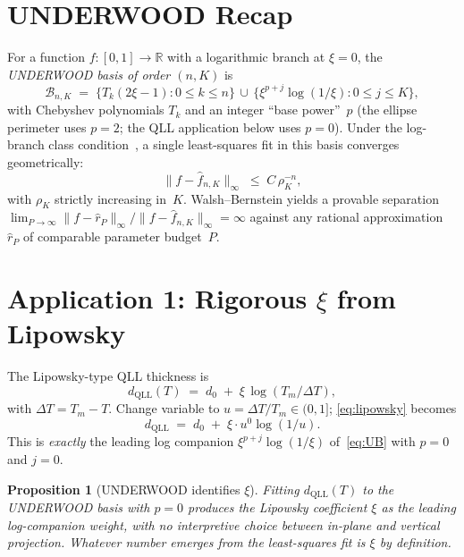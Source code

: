 \documentclass[11pt,letterpaper]{article}
\theoremstyle{plain}
\newtheorem{proposition}[theorem]{Proposition}
\theoremstyle{definition}
\newcommand{\R}{\mathbb{R}}
\begin{document}
\section{UNDERWOOD Recap}

For a function $f : [0,1] \to \R$ with a logarithmic branch at
$\xi = 0$, the \emph{UNDERWOOD basis of order $(n, K)$} is
\begin{equation}\label{eq:UB}
  \mathcal{B}_{n,K} \;=\;
  \{T_k(2\xi-1) : 0 \le k \le n\} \,\cup\,
  \{\xi^{p+j}\log(1/\xi) : 0 \le j \le K\},
\end{equation}
with Chebyshev polynomials $T_k$ and an integer ``base power''~$p$
(the ellipse perimeter uses $p=2$; the QLL application below uses
$p = 0$).  Under the log-branch class condition~\cite{Underwood2026},
a single least-squares fit in this basis converges geometrically:
\begin{equation}\label{eq:geometric}
  \|f - \hat{f}_{n,K}\|_\infty \;\le\; C \, \rho_K^{-n},
\end{equation}
with $\rho_K$ strictly increasing in~$K$.  Walsh--Bernstein yields a
provable separation
$\lim_{P \to \infty} \|f - \hat{r}_P\|_\infty / \|f - \hat{f}_{n,K}\|_\infty
= \infty$ against any rational approximation~$\hat{r}_P$ of comparable
parameter budget~$P$.

\section{Application 1: Rigorous $\xi$ from Lipowsky}

The Lipowsky-type QLL thickness is
\begin{equation}\label{eq:lipowsky}
  d_{\text{QLL}}(T) \;=\; d_0 \;+\; \xi \, \log(T_m/\Delta T),
\end{equation}
with $\Delta T = T_m - T$.  Change variable to $u = \Delta T/T_m
\in (0, 1]$; \eqref{eq:lipowsky} becomes
\begin{equation}\label{eq:d-in-u}
  d_{\text{QLL}} \;=\; d_0 \;+\; \xi \cdot u^0 \log(1/u).
\end{equation}
This is \emph{exactly} the leading log companion
$\xi^{p+j}\log(1/\xi)$ of~\eqref{eq:UB} with $p = 0$ and $j = 0$.

\begin{proposition}[UNDERWOOD identifies $\xi$]\label{prop:UW-xi}
Fitting $d_{\text{QLL}}(T)$ to the UNDERWOOD basis with $p = 0$
produces the Lipowsky coefficient $\xi$ as the leading log-companion
weight, with no interpretive choice between in-plane and vertical
projection.  Whatever number emerges from the least-squares fit is
$\xi$ by definition.
\end{proposition}
\end{document}
